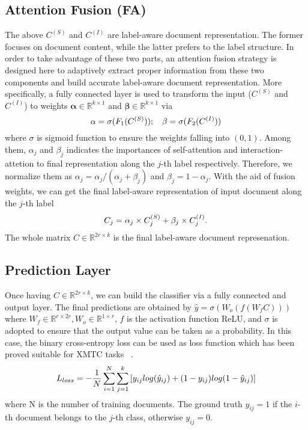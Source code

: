 \documentclass[runningheads]{llncs}
\newenvironment{sequation}{\begin{equation}\small}{\end{equation}}
\begin{document}
\subsection{Attention Fusion (FA)}
The above ${C}^{(S)}$ and ${C}^{(I)}$ are label-aware document representation. The former focuses on document content, while the latter prefers to the label structure. In order to take advantage of these two parts, an attention fusion strategy is designed here to adaptively extract proper information from these two components and build accurate label-aware document representation. 
More specifically, a fully connected layer is used to transform the input (${C}^{(S)}$ and ${C}^{(I)}$) to weights $\mathbf{\alpha}\in { \mathbb{R} }^{ k\times 1 }$ and $\mathbf{\beta}\in { \mathbb{R} }^{ k\times 1 }$ via
\begin{sequation}
\mathbf{\alpha} =\sigma ({ F }_{ 1 }({ C }^{ (S) })); \quad
\mathbf{\beta} =\sigma ({ F }_{ 2 }({ C }^{ (I) }))
\end{sequation}
where $\sigma$ is sigmoid function to ensure the weights falling into $(0,1)$. Among them, $\alpha_j$ and $\beta_j$ indicates the importances of self-attention and interaction-attetion to final representation along the $j$-th label respectively. Therefore, we normalize them as ${ \alpha  }_{ j }={ \alpha  }_{ j }/({ \alpha  }_{ j }+\beta _{ j})$ and ${ \beta  }_{ j }=1-{ \alpha  }_{ j }$.
With the aid of fusion weights, we can get the final label-aware representation of input document along the $j$-th label 
\begin{sequation}
C_{j}=\alpha_{j} \times { C }_{j}^{ (S) }+\beta_{j} \times { C }_{j}^{ (I) }.
\end{sequation}
The whole matrix $C\in \mathbb{R}^{2r\times k} $ is the final label-aware document represenation.

\subsection{Prediction Layer}
Once having $C\in{ \mathbb{R} }^{ 2r\times k }$, we can build the classifier via a fully connected and output layer. 
The final predictions are obtained by $\hat { y } =\sigma ({ W }_{ o }(f({ W }_{ f }C)))$
where ${ W }_{ f }\in{ \mathbb{R} }^{ r\times 2r }, { W }_{ o }\in{ \mathbb{R} }^{ 1\times r }$, $f$ is the activation function ReLU, and $\sigma$ is adopted to ensure that the output value can be taken as a probability. In this case, 
the binary cross-entropy loss can be used as loss function which has been proved suitable for XMTC tasks~\cite{ref_article6} .
\begin{sequation}
L_{loss}=-\frac { 1 }{ N } \sum _{ i=1 }^{ N }{ \sum _{ j=1 }^{ k }{ [{ y }_{ ij }log(\hat { y } _{ ij })+(1-{ y }_{ ij })log(1-\hat { y } _{ ij })] }  } 
\end{sequation}
where N is the number of training documents. The ground truth $y_{ij}=1$ if the $i$-th document belongs to the $j$-th class, otherwise $y_{ij}=0$.
\end{document}
